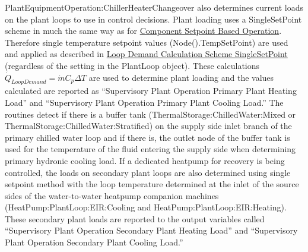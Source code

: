 PlantEquipmentOperation:ChillerHeaterChangeover also determines current loads on the plant loops to use in control decisions.  Plant loading uses a SingleSetPoint scheme in much the same way as for \hyperref[component-setpoint-based-operation]{Component Setpoint Based Operation}.  Therefore single temperature setpoint values (Node().TempSetPoint) are used and applied as described in \hyperref[loop-demand-calculation-scheme-singlesetpoint]{Loop Demand Calculation Scheme SingleSetPoint} (regardless of the setting in the PlantLoop object). These calculations $\dot Q_{LoopDemand} = {\dot m }{ C_p} { \Delta {T}} $ are used to determine plant loading and the values calculated are reported as ``Supervisory Plant Operation Primary Plant Heating Load'' and ``Supervisory Plant Operation Primary Plant Cooling Load.''  The routines detect if there is a buffer tank (ThermalStorage:ChilledWater:Mixed or ThermalStorage:ChilledWater:Stratified) on the supply side inlet branch of the primary chilled water loop and if there is, the outlet node of the buffer tank is used for the temperature of the fluid entering the supply side when determining primary hydronic cooling load. If a dedicated heatpump for recovery is being controlled, the loads on secondary plant loops are also determined using single setpoint method with the loop temperature determined at the inlet of the source sides of the water-to-water heatpump companion machines (HeatPump:PlantLoop:EIR:Cooling and HeatPump:PlantLoop:EIR:Heating). These secondary plant loads are reported to the output variables called ``Supervisory Plant Operation Secondary Plant Heating Load'' and ``Supervisory Plant Operation Secondary Plant Cooling Load.''
